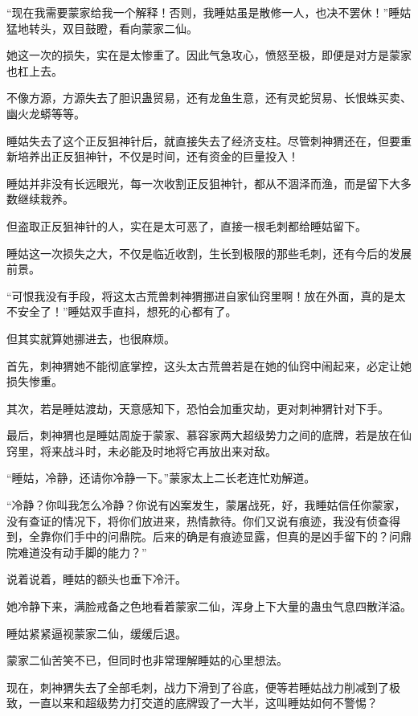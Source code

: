 
\begin{this_body}

“现在我需要蒙家给我一个解释！否则，我睡姑虽是散修一人，也决不罢休！”睡姑猛地转头，双目鼓瞪，看向蒙家二仙。

她这一次的损失，实在是太惨重了。因此气急攻心，愤怒至极，即便是对方是蒙家也杠上去。

不像方源，方源失去了胆识蛊贸易，还有龙鱼生意，还有灵蛇贸易、长恨蛛买卖、幽火龙蟒等等。

睡姑失去了这个正反狙神针后，就直接失去了经济支柱。尽管刺神猬还在，但要重新培养出正反狙神针，不仅是时间，还有资金的巨量投入！

睡姑并非没有长远眼光，每一次收割正反狙神针，都从不涸泽而渔，而是留下大多数继续栽养。

但盗取正反狙神针的人，实在是太可恶了，直接一根毛刺都给睡姑留下。

睡姑这一次损失之大，不仅是临近收割，生长到极限的那些毛刺，还有今后的发展前景。

“可恨我没有手段，将这太古荒兽刺神猬挪进自家仙窍里啊！放在外面，真的是太不安全了！”睡姑双手直抖，想死的心都有了。

但其实就算她挪进去，也很麻烦。

首先，刺神猬她不能彻底掌控，这头太古荒兽若是在她的仙窍中闹起来，必定让她损失惨重。

其次，若是睡姑渡劫，天意感知下，恐怕会加重灾劫，更对刺神猬针对下手。

最后，刺神猬也是睡姑周旋于蒙家、慕容家两大超级势力之间的底牌，若是放在仙窍里，将来战斗时，未必能及时地将它再放出来对敌。

“睡姑，冷静，还请你冷静一下。”蒙家太上二长老连忙劝解道。

“冷静？你叫我怎么冷静？你说有凶案发生，蒙屠战死，好，我睡姑信任你蒙家，没有查证的情况下，将你们放进来，热情款待。你们又说有痕迹，我没有侦查得到，全靠你们手中的问鼎院。后来的确是有痕迹显露，但真的是凶手留下的？问鼎院难道没有动手脚的能力？”

说着说着，睡姑的额头也垂下冷汗。

她冷静下来，满脸戒备之色地看着蒙家二仙，浑身上下大量的蛊虫气息四散洋溢。

睡姑紧紧逼视蒙家二仙，缓缓后退。

蒙家二仙苦笑不已，但同时也非常理解睡姑的心里想法。

现在，刺神猬失去了全部毛刺，战力下滑到了谷底，便等若睡姑战力削减到了极致，一直以来和超级势力打交道的底牌毁了一大半，这叫睡姑如何不警惕？


\end{this_body}
